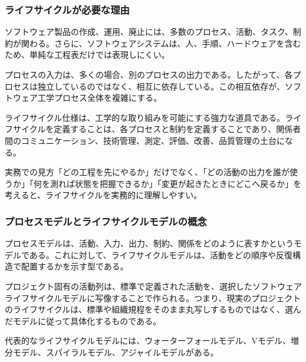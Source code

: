 \documentclass[a4paper,11pt]{ltjsarticle}
\numberwithin{figure}{section}
\numberwithin{table}{section}
\begin{document}
\subsubsection{ライフサイクルが必要な理由}
ソフトウェア製品の作成、運用、廃止には、多数のプロセス、活動、タスク、制約が関わる。さらに、ソフトウェアシステムは、人、手順、ハードウェアを含むため、単純な工程表だけでは表現しにくい。

プロセスの入力は、多くの場合、別のプロセスの出力である。したがって、各プロセスは独立しているのではなく、相互に依存している。この相互依存が、ソフトウェア工学プロセス全体を複雑にする。

ライフサイクル仕様は、工学的な取り組みを可能にする強力な道具である。ライフサイクルを定義することは、各プロセスと制約を定義することであり、関係者間のコミュニケーション、技術管理、測定、評価、改善、品質管理の土台になる。

\begin{pointbox}{実務での見方}「どの工程を先にやるか」だけでなく、「どの活動の出力を誰が使うか」「何を測れば状態を把握できるか」「変更が起きたときにどこへ戻るか」を考えると、ライフサイクルを実務的に理解しやすい。\end{pointbox}
\subsubsection{プロセスモデルとライフサイクルモデルの概念}
プロセスモデルは、活動、入力、出力、制約、関係をどのように表すかというモデルである。これに対して、ライフサイクルモデルは、活動をどの順序や反復構造で配置するかを示す型である。

プロジェクト固有の活動列は、標準で定義された活動を、選択したソフトウェアライフサイクルモデルに写像することで作られる。つまり、現実のプロジェクトのライフサイクルは、標準や組織規程をそのまま丸写しするものではなく、選んだモデルに従って具体化するものである。

代表的なライフサイクルモデルには、ウォーターフォールモデル、Vモデル、増分モデル、スパイラルモデル、アジャイルモデルがある。
\end{document}
